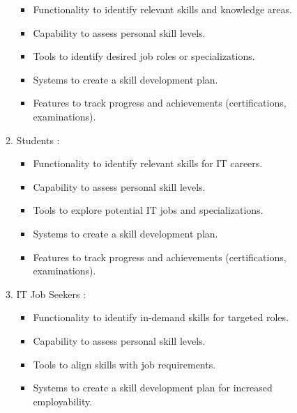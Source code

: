\begin{enumerate}
\begin{enumerate}
\begin{itemize}
                        \renewcommand\labelitemi{-}
                        \item Functionality to identify relevant skills and knowledge areas.
                        \item Capability to assess personal skill levels.
                        \item Tools to identify desired job roles or specializations.
                        \item Systems to create a skill development plan.
                        \item Features to track progress and achievements (certifications, examinations).
                    \end{itemize}
              \item Students : \\
                    \begin{itemize}
                        \renewcommand\labelitemi{-}
                        \item Functionality to identify relevant skills for IT careers.
                        \item Capability to assess personal skill levels.
                        \item Tools to explore potential IT jobs and specializations.
                        \item Systems to create a skill development plan.
                        \item Features to track progress and achievements (certifications, examinations).
                    \end{itemize}
                    \newpage      
              \item IT Job Seekers : \\
                    \begin{itemize}
                        \renewcommand\labelitemi{-}
                        \item Functionality to identify in-demand skills for targeted roles.
                        \item Capability to assess personal skill levels.
                        \item Tools to align skills with job requirements.
                        \item Systems to create a skill development plan for increased employability.
                    \end{itemize}
          \end{enumerate}

\end{enumerate}

